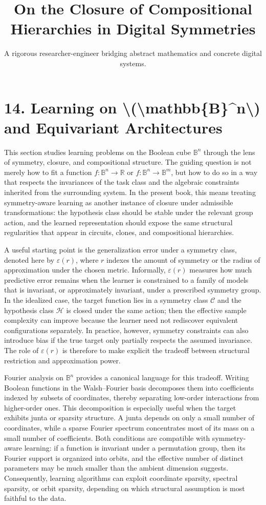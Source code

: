 \documentclass[11pt]{article}
\title{On the Closure of Compositional Hierarchies in Digital Symmetries}
\author{A rigorous researcher-engineer bridging abstract mathematics and concrete digital systems.}
\begin{document}
\section*{14. Learning on \textbackslash{}(\textbackslash{}mathbb\{B\}\textasciicircum{}n\textbackslash{}) and Equivariant Architectures}

This section studies learning problems on the Boolean cube \(\mathbb{B}^n\) through the lens of symmetry, closure, and compositional structure. The guiding question is not merely how to fit a function \(f : \mathbb{B}^n \to \mathbb{R}\) or \(f : \mathbb{B}^n \to \mathbb{B}^m\), but how to do so in a way that respects the invariances of the task class and the algebraic constraints inherited from the surrounding system. In the present book, this means treating symmetry-aware learning as another instance of closure under admissible transformations: the hypothesis class should be stable under the relevant group action, and the learned representation should expose the same structural regularities that appear in circuits, clones, and compositional hierarchies.

A useful starting point is the generalization error under a symmetry class, denoted here by \(\varepsilon(r)\), where \(r\) indexes the amount of symmetry or the radius of approximation under the chosen metric. Informally, \(\varepsilon(r)\) measures how much predictive error remains when the learner is constrained to a family of models that is invariant, or approximately invariant, under a prescribed symmetry group. In the idealized case, the target function lies in a symmetry class \(\mathcal{C}\) and the hypothesis class \(\mathcal{H}\) is closed under the same action; then the effective sample complexity can improve because the learner need not rediscover equivalent configurations separately. In practice, however, symmetry constraints can also introduce bias if the true target only partially respects the assumed invariance. The role of \(\varepsilon(r)\) is therefore to make explicit the tradeoff between structural restriction and approximation power.

Fourier analysis on \(\mathbb{B}^n\) provides a canonical language for this tradeoff. Writing Boolean functions in the Walsh--Fourier basis decomposes them into coefficients indexed by subsets of coordinates, thereby separating low-order interactions from higher-order ones. This decomposition is especially useful when the target exhibits junta or sparsity structure. A junta depends on only a small number of coordinates, while a sparse Fourier spectrum concentrates most of its mass on a small number of coefficients. Both conditions are compatible with symmetry-aware learning: if a function is invariant under a permutation group, then its Fourier support is organized into orbits, and the effective number of distinct parameters may be much smaller than the ambient dimension suggests. Consequently, learning algorithms can exploit coordinate sparsity, spectral sparsity, or orbit sparsity, depending on which structural assumption is most faithful to the data.
\end{document}
